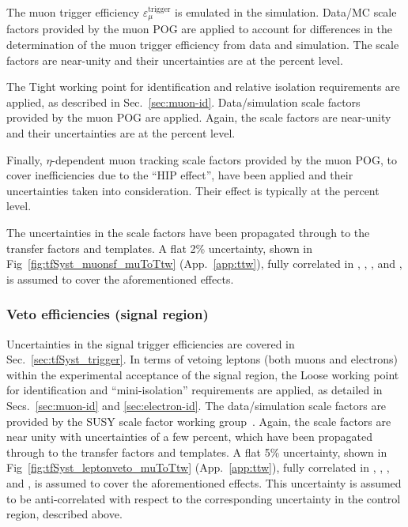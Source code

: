 The muon trigger efficiency $\varepsilon^\textrm{trigger}_\mu$ is
emulated in the simulation. Data/MC scale factors provided by the muon
POG are applied to account for differences in the determination of the
muon trigger efficiency from data and simulation. The scale factors
are near-unity and their uncertainties are at the percent level. 

The Tight working point for identification and relative isolation
requirements are applied, as described in
Sec.~\ref{sec:muon-id}. Data/simulation scale factors provided by the
muon POG are applied. Again, the scale factors are near-unity and
their uncertainties are at the percent level.

Finally, $\eta$-dependent muon tracking scale factors provided by the
muon POG, to cover inefficiencies due to the ``HIP effect'', have been
applied and their uncertainties taken into consideration. Their effect
is typically at the percent level. 

The uncertainties in the scale factors have been propagated through to
the transfer factors and \mht templates. A flat 2\% uncertainty, shown
in Fig~\ref{fig:tfSyst_muonsf_muToTtw} (App.~\ref{app:ttw}), fully
correlated in \njet, \scalht, \nb, and \mht, is assumed to cover the
aforementioned effects.

\subsubsection*{Veto efficiencies (signal region)}

Uncertainties in the signal trigger efficiencies are covered in
Sec.~\ref{sec:tfSyst_trigger}. In terms of vetoing leptons (both muons
and electrons) within the experimental acceptance of the signal
region, the Loose working point for identification and
``mini-isolation'' requirements are applied, as detailed in
Secs.~\ref{sec:muon-id} and \ref{sec:electron-id}. The data/simulation
scale factors are provided by the SUSY scale factor working
group~\cite{twiki-leptonSF}. Again, the scale factors are near unity
with uncertainties of a few percent, which have been propagated
through to the transfer factors and \mht templates. A flat 5\%
uncertainty, shown in Fig~\ref{fig:tfSyst_leptonveto_muToTtw}
(App.~\ref{app:ttw}), fully correlated in \njet, \scalht, \nb, and
\mht, is assumed to cover the aforementioned effects. This uncertainty
is assumed to be anti-correlated with respect to the corresponding
uncertainty in the \mj control region, described above. 

